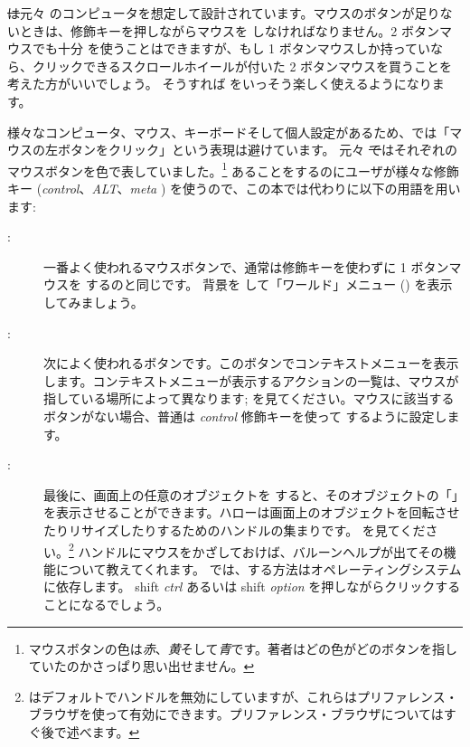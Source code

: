 \documentclass[a4paper,10pt,twoside]{book}
\begin{document}
\st は元々 のコンピュータを想定して設計されています。マウスのボタンが足りないときは、修飾キーを押しながらマウスを \click しなければなりません。2 ボタンマウスでも十分 \pharo を使うことはできますが、もし 1 ボタンマウスしか持っていなら、クリックできるスクロールホイールが付いた 2 ボタンマウスを買うことを考えた方がいいでしょう。 そうすれば \pharo をいっそう楽しく使えるようになります。

様々なコンピュータ、マウス、キーボードそして個人設定があるため、\pharo では「マウスの左ボタンをクリック」という表現は避けています。
元々 \st ではそれぞれのマウスボタンを色で表していました。\footnote{マウスボタンの色は\emph{赤}、\emph{黄}そして\emph{青}です。著者はどの色がどのボタンを指していたのかさっぱり思い出せません。}
あることをするのにユーザが様々な修飾キー (\emph{control}、\emph{ALT}、\emph{meta} \etc) を使うので、この本では代わりに以下の用語を用います:
\begin{description}
\item [\click:] 一番よく使われるマウスボタンで、通常は修飾キーを使わずに 1 ボタンマウスを \click するのと同じです。 背景を \click して「ワールド」メニュー () を表示してみましょう。
\item [\actclick:] 次によく使われるボタンです。このボタンでコンテキストメニューを表示します。コンテキストメニューが表示するアクションの一覧は、マウスが指している場所によって異なります;  を見てください。マウスに該当するボタンがない場合、普通は \emph{control} 修飾キーを使って \actclick するように設定します。
\item [\metaclick:] 最後に、画面上の任意のオブジェクトを \metaclick すると、そのオブジェクトの「」を表示させることができます。ハローは画面上のオブジェクトを回転させたりリサイズしたりするためのハンドルの集まりです。  を見てください。\footnote{\pharo はデフォルトでハンドルを無効にしていますが、これらはプリファレンス・ブラウザを使って有効にできます。プリファレンス・ブラウザについてはすぐ後で述べます。}
ハンドルにマウスをかざしておけば、バルーンヘルプが出てその機能について教えてくれます。
\pharo では、\metaclick する方法はオペレーティングシステムに依存します。
{\sc shift} \emph{ctrl} あるいは {\sc shift} \emph{option} を押しながらクリックすることになるでしょう。
\end{description}
\end{document}
